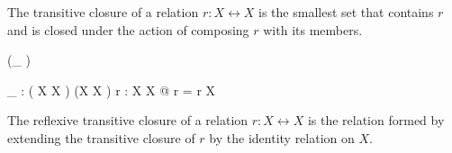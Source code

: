 \documentclass[draft,a4paper,10pt,wd]{isov2}
\begin{document}
The transitive closure of a relation $r : X \rel X$ is
the smallest set that contains $r$ and
is closed under the action of composing $r$ with its members.


\begin{zed}
\function (\_ \star)
\end{zed}

\begin{gendef}[X]
\_ \star : ( X \rel X ) \fun (X \rel X )
\where
\forall r : X \rel X @ r \star = r \plus \cup \id X
\end{gendef}

The reflexive transitive closure of a relation $r : X \rel X$ is the
relation formed by extending the transitive closure of $r$ by the identity
relation on $X$.
\end{document}
